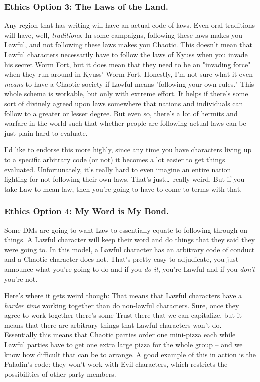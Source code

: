 \subsubsection{Ethics Option 3: The Laws of the Land.}
Any region that has writing will have an actual code of laws. Even oral traditions will have, well, \textit{traditions}. In some campaigns, following these laws makes you Lawful, and not following these laws makes you Chaotic. This doesn't mean that Lawful characters necessarily have to follow the laws of Kyuss when you invade his secret Worm Fort, but it does mean that they need to be an "invading force" when they run around in Kyuss' Worm Fort. Honestly, I'm not sure what it even \textit{means} to have a Chaotic society if Lawful means "following your own rules." This whole schema is workable, but only with extreme effort. It helps if there's some sort of divinely agreed upon laws somewhere that nations and individuals can follow to a greater or lesser degree. But even so, there's a lot of hermits and warfare in the world such that whether people are following actual laws can be just plain hard to evaluate.

I'd like to endorse this more highly, since any time you have characters living up to a specific arbitrary code (or not) it becomes a lot easier to get things evaluated. Unfortunately, it's really hard to even imagine an entire nation fighting for not following their own laws. That's just\ldots\  really weird. But if you take Law to mean law, then you're going to have to come to terms with that.

\subsubsection{Ethics Option 4: My Word is My Bond.}
Some DMs are going to want Law to essentially equate to following through on things. A Lawful character will keep their word and do things that they said they were going to. In this model, a Lawful character has an arbitrary code of conduct and a Chaotic character does not. That's pretty easy to adjudicate, you just announce what you're going to do and if you \textit{do it}, you're Lawful and if you \textit{don't} you're not.

Here's where it gets weird though: That means that Lawful characters have a \textit{harder time} working together than do non-lawful characters. Sure, once they agree to work together there's some Trust there that we can capitalize, but it means that there are arbitrary things that Lawful characters won't do. Essentially this means that Chaotic parties order one mini-pizza each while Lawful parties have to get one extra large pizza for the whole group -- and we know how difficult that can be to arrange. A good example of this in action is the Paladin's code: they won't work with Evil characters, which restricts the possibilities of other party members.

